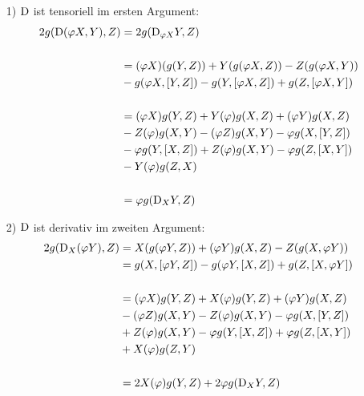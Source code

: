 \begin{bew}
\begin{enumerate}
\item[1) ] $\mathrm{D}$ ist tensoriell im ersten Argument:
\begin{align*}
2g(\mathrm{D}(\varphi X, Y),Z) &= 2g(\mathrm{D}_{\varphi X}Y, Z) \\
									\phantom{.}\\
									 &= (\varphi X)(g(Y, Z)) + Y(g(\varphi X, Z)) - Z(g(\varphi X, Y)) \\
									 &\phantom{ }- g(\varphi X, [Y, Z])  - g(Y, [\varphi X, Z]) + g(Z, [\varphi X,Y]) \\
									 \phantom{.}\\
									 &= (\varphi X) g(Y, Z) + Y(\varphi)g(X, Z) +(\varphi Y)g(X, Z) \\
									 &\phantom{ }- Z(\varphi)g(X, Y) - (\varphi Z) g(X, Y) - \varphi g(X, [Y, Z]) \\
									 &\phantom{ }-\varphi g(Y, [X, Z]) + Z(\varphi) g(X, Y) - \varphi g(Z, [X, Y]) \\
									 &\phantom{ }-Y(\varphi)g(Z, X)	\\
									 \phantom{.}\\
									 &= \varphi g(\mathrm{D}_XY, Z)							 
\end{align*}
\item[2) ] $\mathrm{D}$ ist derivativ im zweiten Argument:
\begin{align*}
2g(\mathrm{D}_X(\varphi Y), Z) &= X(g(\varphi Y, Z))	+ (\varphi Y) g(X, Z) - Z(g(X, \varphi Y))		\\
										&= g(X, [\varphi Y, Z]) - g(\varphi Y, [X, Z]) + g(Z, [X, \varphi Y]) \\
										\phantom{.}\\
										&= (\varphi X) g(Y, Z) + X(\varphi) g(Y, Z) + (\varphi Y)g(X, Z) \\
										&\phantom{ }- (\varphi Z)g(X, Y) - Z(\varphi)g(X, Y) - \varphi g(X, [Y, Z]) \\
										&\phantom{ }+ Z(\varphi)g(X, Y) - \varphi g(Y, [X, Z]) + \varphi g(Z, [X, Y]) \\
										&\phantom{ }+ X(\varphi)g(Z, Y)\\
										\phantom{.}\\
										&= 2X(\varphi) g(Y, Z) + 2\varphi g(\mathrm{D}_XY,Z)																										
\end{align*}
\end{enumerate}
\end{bew}


